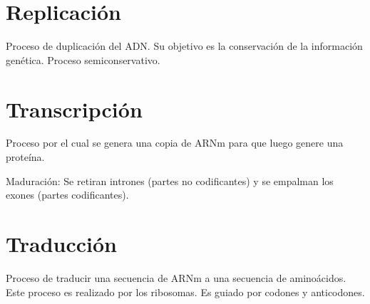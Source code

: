 \section{Replicación}

Proceso de duplicación del ADN.
Su objetivo es la conservación de la información genética.
Proceso semiconservativo.

\section{Transcripción}

Proceso por el cual se genera una copia de ARNm para que luego genere una proteína.

Maduración: Se retiran intrones (partes no codificantes) y se empalman los exones (partes codificantes).

\section{Traducción}

Proceso de traducir una secuencia de ARNm a una secuencia de aminoácidos.
Este proceso es realizado por los ribosomas.
Es guiado por codones y anticodones.